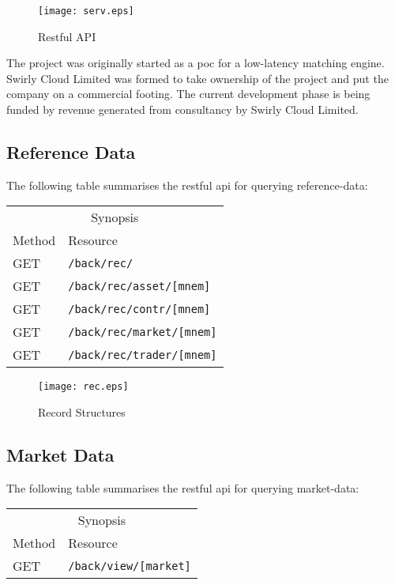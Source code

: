 \documentclass[11pt,a4paper]{article}
\newcommand{\scltd}{Swirly Cloud Limited\cite{swirlycloud:www}}
\begin{document}
\begin{figure}[H]
\centering
\texttt{[image: serv.eps]}
\caption{Restful API}
\end{figure}

The project was originally started as a \gls{poc} for a low-latency \gls{matching engine}. \scltd{}
was formed to take ownership of the project and put the company on a commercial footing. The current
development phase is being funded by revenue generated from consultancy by \scltd{}.

\subsection{Reference Data}

The following table summarises the \gls{restful} \gls{api} for querying reference-data:

\vspace{5mm}
\begin{tabular}{ll}
\multicolumn{2}{c}{Synopsis}\\
Method&Resource\\
\hline
GET&\texttt{/back/rec/}\\
GET&\texttt{/back/rec/asset/[mnem]}\\
GET&\texttt{/back/rec/contr/[mnem]}\\
GET&\texttt{/back/rec/market/[mnem]}\\
GET&\texttt{/back/rec/trader/[mnem]}\\
\end{tabular}
\vspace{5mm}

\begin{figure}[H]
\centering
\texttt{[image: rec.eps]}
\caption{Record Structures}
\end{figure}

\subsection{Market Data}

The following table summarises the \gls{restful} \gls{api} for querying \gls{market}-data:

\vspace{5mm}
\begin{tabular}{ll}
\multicolumn{2}{c}{Synopsis}\\
Method&Resource\\
\hline
GET&\texttt{/back/view/[market]}\\
\end{tabular}
\vspace{5mm}
\end{document}
